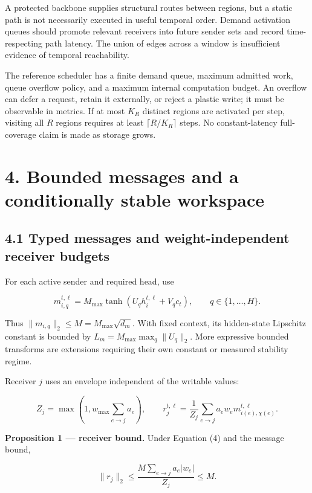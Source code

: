 \documentclass[
  11pt,
  a4paper,
]{article}
\begin{document}
A protected backbone supplies structural routes between regions, but a
static path is not necessarily executed in useful temporal order. Demand
activation queues should promote relevant receivers into future sender
sets and record time-respecting path latency. The union of edges across
a window is insufficient evidence of temporal reachability.

The reference scheduler has a finite demand queue, maximum admitted
work, queue overflow policy, and a maximum internal computation budget.
An overflow can defer a request, retain it externally, or reject a
plastic write; it must be observable in metrics. If at most \(K_R\)
distinct regions are activated per step, visiting all \(R\) regions
requires at least \(\lceil R/K_R\rceil\) steps. No constant-latency
full-coverage claim is made as storage grows.

\section{4. Bounded messages and a conditionally stable
workspace}\label{bounded-messages-and-a-conditionally-stable-workspace}

\subsection{4.1 Typed messages and weight-independent receiver
budgets}\label{typed-messages-and-weight-independent-receiver-budgets}

For each active sender and required head, use

\[
m_{i,q}^{t,\ell}
=M_{\max}\tanh(U_q h_i^{t,\ell}+V_q c_t),
\qquad q\in\{1,\ldots,H\}.
\tag{8}
\]

Thus \(\|m_{i,q}\|_2\le M=M_{\max}\sqrt{d_m}\). With fixed context, its
hidden-state Lipschitz constant is bounded by
\(L_m=M_{\max}\max_q\|U_q\|_2\). More expressive bounded transforms are
extensions requiring their own constant or measured stability regime.

Receiver \(j\) uses an envelope independent of the writable values:

\[
Z_j=\max\!\left(1,w_{\max}\sum_{e\to j}a_e\right),
\qquad
r_j^{t,\ell}=\frac1{Z_j}\sum_{e\to j}a_e w_e m_{i(e),\chi(e)}^{t,\ell}.
\tag{9}
\]

\textbf{Proposition 1 --- receiver bound.} Under Equation (4) and the
message bound,

\[
\|r_j\|_2
\le\frac{M\sum_{e\to j}a_e|w_e|}{Z_j}
\le M.
\tag{10}
\]
\end{document}

